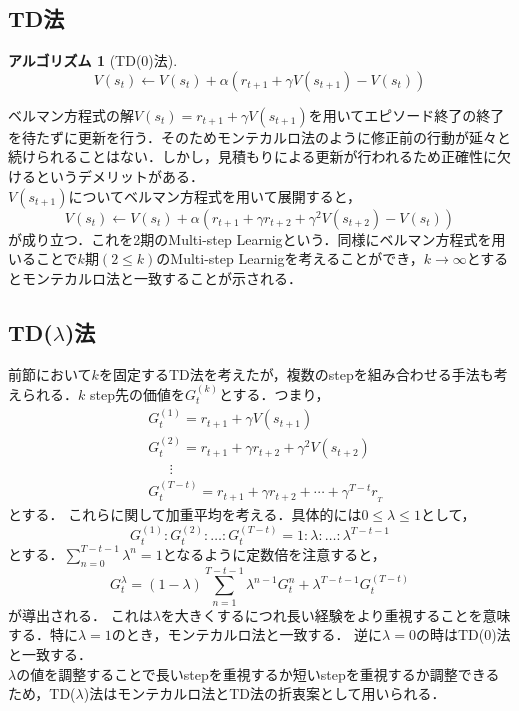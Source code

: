 \documentclass[a4paper,12pt]{jsreport}
\theoremstyle{definition}
\newtheorem{algorithm}{アルゴリズム}
\begin{document}
\subsection{TD法}
\begin{algorithm}[TD(0)法]
    \begin{equation}
        V(s_t)\leftarrow V(s_t)+\alpha(r_{t+1}+\gamma V(s_{t+1})-V(s_t))
    \end{equation}
\end{algorithm}
ベルマン方程式の解$V(s_t)=r_{t+1}+\gamma V(s_{t+1})$を用いてエピソード終了の終了を待たずに更新を行う．そのためモンテカルロ法のように修正前の行動が延々と続けられることはない．しかし，見積もりによる更新が行われるため正確性に欠けるというデメリットがある．\\
$V(s_{t+1})$についてベルマン方程式を用いて展開すると，
\begin{equation}
    V(s_t)\leftarrow V(s_t)+\alpha(r_{t+1}+\gamma r_{t+2}+\gamma^2 V(s_{t+2})-V(s_t))
\end{equation}
が成り立つ．これを2期のMulti-step Learnigという．同様にベルマン方程式を用いることで$k$期$(2\leq k)$のMulti-step Learnigを考えることができ，$k\to \infty$とするとモンテカルロ法と一致することが示される．

\subsection{TD($\lambda$)法}
前節において$k$を固定するTD法を考えたが，複数のstepを組み合わせる手法も考えられる．$k$ step先の価値を$G_t^{(k)}$とする．つまり，
\begin{align*}
    &G_t^{(1)}=r_{t+1}+\gamma V(s_{t+1})\\
    &G_t^{(2)}=r_{t+1}+\gamma r_{t+2}+\gamma^2 V(s_{t+2})\\
    &\ \ \ \  \ \ \ \vdots\\
    &G_t^{(T-t)}=r_{t+1}+\gamma r_{t+2}+\cdots+\gamma^{T-t} r_{_T}
\end{align*}
とする．
これらに関して加重平均を考える．具体的には$0\leq\lambda\leq 1$として，
\begin{equation}
    G_t^{(1)}:G_t^{(2)}:\ldots:G_t^{(T-t)}=1:\lambda:\ldots:\lambda^{T-t-1}
\end{equation}
とする．$\displaystyle \sum_{n=0}^{T-t-1}\lambda^n=1$となるように定数倍を注意すると，
\begin{equation}
    G_t^{\lambda}=(1-\lambda)\sum_{n=1}^{T-t-1}\lambda^{n-1}G_t^{n}+\lambda^{T-t-1}G_t^{(T-t)}
\end{equation}
が導出される．
これは$\lambda$を大きくするにつれ長い経験をより重視することを意味する．特に$\lambda=1$のとき，モンテカルロ法と一致する．
逆に$\lambda=0$の時はTD(0)法と一致する．\\
$\lambda$の値を調整することで長いstepを重視するか短いstepを重視するか調整できるため，TD($\lambda$)法はモンテカルロ法とTD法の折衷案として用いられる．
\end{document}
